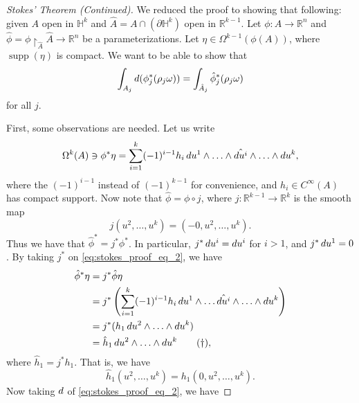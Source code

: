 \documentclass[notoc,notitlepage]{tufte-book}
\DeclareMathOperator{\supp}{supp}
\begin{document}
\begin{proof}[Stokes' Theorem (Continued)]
  We reduced the proof to showing that following: given $A$ open in
  $\mathbb{H}^k$ and $\hat{A} = A \cap (\partial \mathbb{H}^k)$ open in
  $\mathbb{R}^{k-1}$. Let $\phi : A \to \mathbb{R}^n$ and $\hat{\phi} = \phi
  \restriction_{\hat{A}} \hat{A} \to \mathbb{R}^n$ be a parameterizations. Let
  $\eta \in \Omega^{k-1}(\phi(A))$, where $\supp(\eta)$ is compact. We want to
  be able to show that
  \begin{equation*}
    \int_{A_j} \mathop{}\!d{(\phi_j^*(\rho_j \omega))} = \int_{\hat{A}_j}
    \hat{\phi}_j^*(\rho_j \omega) 
  \end{equation*}
  for all $j$.

  First, some observations are needed. Let us write
  \begin{equation}\label{eq:stokes_proof_eq_2}
    \Omega^k(A) \ni \phi^* \eta = \sum_{i=1}^{k} (-1)^{i-1} h_i \mathop{}\!d{u^1} \land
    \hdots \land \hat{\mathop{}\!d{u^i}} \land \hdots \land \mathop{}\!d{u^k},
  \end{equation}
  where the $(-1)^{i-1}$ instead of $(-1)^{k-1}$ for convenience, and $h_i \in
  C^\infty(A)$ has compact support. Now note that  $\hat{\phi} = \phi \circ j$,
  where $j : \mathbb{R}^{k-1} \to \mathbb{R}^k$ is the smooth map
  \begin{equation*}
    j(u^2, \ldots, u^k) = (-0, u^2, \ldots, u^k).
  \end{equation*}
  Thus we have that $\hat{\phi}^* = j^* \phi^*$. In particular, $j^* \mathop{}\!d{u^i} =
  \mathop{}\!d{u^i}$ for $i > 1$, and $j^* \mathop{}\!d{u^1} = 0$. By taking $j^*$ on
  \cref{eq:stokes_proof_eq_2}, we have
  \begin{align*}
    \hat{\phi}^* \eta &= j^* \hat{\phi} \eta \\
                      &= j^* \left( \sum_{i=1}^{k} (-1)^{i-1} h_i \mathop{}\!d{u^1}
                      \land \hdots \hat{\mathop{}\!d{u^i}} \land \hdots \land \mathop{}\!d{u^k}
                    \right) \\
                      &= j^*(h_1 \mathop{}\!d{u^2} \land \hdots \land \mathop{}\!d{u^k}) \\
                      &= \hat{h}_1 \mathop{}\!d{u^2} \land \hdots \land \mathop{}\!d{u^k}
                      \tag{$\dagger$}\label{eq:stokes_proof_eq_3},
  \end{align*}
  where $\hat{h}_1 = j^* h_1$. That is, we have
  \begin{equation*}
    \hat{h}_1(u^2, \ldots, u^k) = h_1(0, u^2, \ldots, u^k).
  \end{equation*}
  Now taking $\mathop{}\!d{}$ of \cref{eq:stokes_proof_eq_2}, we have

\end{proof}
\end{document}
